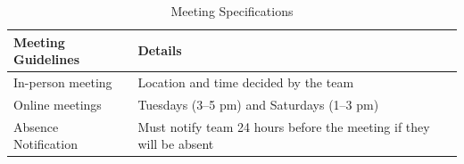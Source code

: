 \documentclass{article} %
\begin{document}
\begin{table}[h]
\centering
\caption{Meeting Specifications}
\vspace{0.5em}  %
\begin{tabular}{|p{4cm}|p{10cm}|}
\hline
\textbf{Meeting Guidelines} & \textbf{Details} \\ \hline
In-person meeting           & Location and time decided by the team \\ \hline
Online meetings             & Tuesdays (3–5 pm) and Saturdays (1–3 pm) \\ \hline
Absence Notification        & Must notify team 24 hours before the meeting if they will be absent \\ \hline
\end{tabular}
\end{table}

\end{document}
